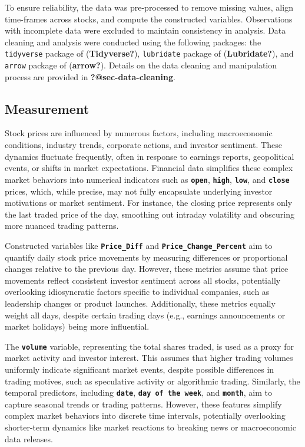 \documentclass[
  letterpaper,
  DIV=11,
  numbers=noendperiod]{scrartcl}
\begin{document}
To ensure reliability, the data was pre-processed to remove missing
values, align time-frames across stocks, and compute the constructed
variables. Observations with incomplete data were excluded to maintain
consistency in analysis. Data cleaning and analysis were conducted using
the following packages: the \texttt{tidyverse} package of
(\textbf{Tidyverse?}), \texttt{lubridate} package of
(\textbf{Lubridate?}), and \texttt{arrow} package of (\textbf{arrow?}).
Details on the data cleaning and manipulation process are provided in
\textbf{?@sec-data-cleaning}.

\subsection{Measurement}\label{measurement}

Stock prices are influenced by numerous factors, including macroeconomic
conditions, industry trends, corporate actions, and investor sentiment.
These dynamics fluctuate frequently, often in response to earnings
reports, geopolitical events, or shifts in market expectations.
Financial data simplifies these complex market behaviors into numerical
indicators such as \textbf{\texttt{open}}, \textbf{\texttt{high}},
\textbf{\texttt{low}}, and \textbf{\texttt{close}} prices, which, while
precise, may not fully encapsulate underlying investor motivations or
market sentiment. For instance, the closing price represents only the
last traded price of the day, smoothing out intraday volatility and
obscuring more nuanced trading patterns.

Constructed variables like \textbf{\texttt{Price\_Diff}} and
\textbf{\texttt{Price\_Change\_Percent}} aim to quantify daily stock
price movements by measuring differences or proportional changes
relative to the previous day. However, these metrics assume that price
movements reflect consistent investor sentiment across all stocks,
potentially overlooking idiosyncratic factors specific to individual
companies, such as leadership changes or product launches. Additionally,
these metrics equally weight all days, despite certain trading days
(e.g., earnings announcements or market holidays) being more
influential.

The \textbf{\texttt{volume}} variable, representing the total shares
traded, is used as a proxy for market activity and investor interest.
This assumes that higher trading volumes uniformly indicate significant
market events, despite possible differences in trading motives, such as
speculative activity or algorithmic trading. Similarly, the temporal
predictors, including \textbf{\texttt{date}},
\textbf{\texttt{day\ of\ the\ week}}, and \textbf{\texttt{month}}, aim
to capture seasonal trends or trading patterns. However, these features
simplify complex market behaviors into discrete time intervals,
potentially overlooking shorter-term dynamics like market reactions to
breaking news or macroeconomic data releases.
\end{document}
